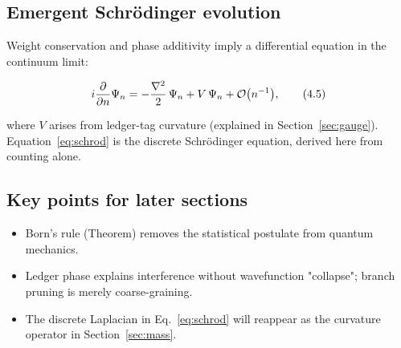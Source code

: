 \subsection{Emergent Schrödinger evolution}

Weight conservation and phase additivity imply a differential equation
in the continuum limit:

\[
  i\frac{\partial}{\partial n}\Psi_n
  =-\frac{\nabla^2}{2}\,\Psi_n + V\,\Psi_n + \order{n^{-1}},
\tag{4.5}\label{eq:schrod}
\]

where $V$ arises from ledger-tag curvature (explained in
Section~\ref{sec:gauge}).  Equation~\eqref{eq:schrod} is the discrete
Schrödinger equation, derived here from counting alone.

\subsection{Key points for later sections}

\begin{itemize}
  \item Born's rule (Theorem) removes the statistical postulate from
        quantum mechanics.
  \item Ledger phase explains interference without wavefunction
        "collapse"; branch pruning is merely coarse-graining.
  \item The discrete Laplacian in Eq.~\eqref{eq:schrod} will reappear
        as the curvature operator in Section~\ref{sec:mass}.
\end{itemize}

\clearpage

